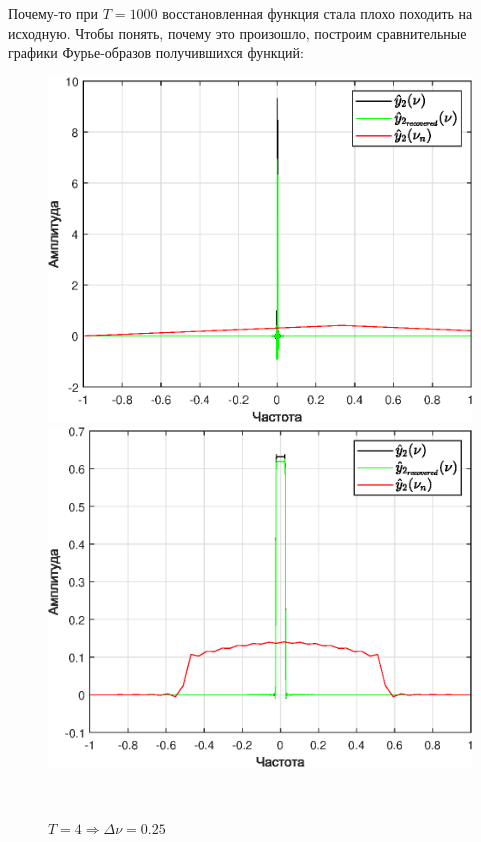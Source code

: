 \documentclass[a4paper]{article}
\begin{document}
Почему-то при $T = 1000$ восстановленная функция стала плохо походить на исходную. Чтобы понять, почему это произошло, построим сравнительные графики Фурье-образов получившихся функций:

\begin{figure}[H]
    \begin{minipage}{0.5\textwidth}
        \centering \includegraphics[width=\textwidth]{graphs2/T_2_dt_0.5_B_1_dv_0.5/func2_image.eps}
        \caption{$T = 2 \Rightarrow \Delta \nu = 0.5$}
    \end{minipage}\hfill
    \begin{minipage}{0.5\textwidth}
        \centering \includegraphics[width=\textwidth]{graphs2/T_25_dt_0.5_B_1_dv_0.04/func2_image.eps}
        \caption{$T = 4 \Rightarrow \Delta \nu = 0.25$}
    \end{minipage}\\[1em]
\end{figure}\noindent\
\end{document}
